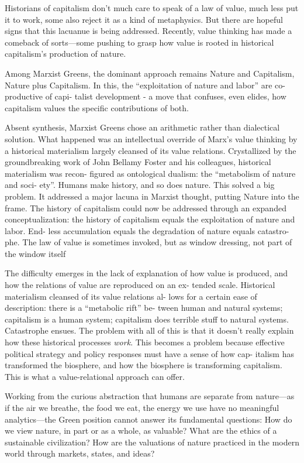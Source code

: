 \documentclass[
]{book}
\begin{document}
Historians of
capitalism don't much care to speak of a law of value, much less put
it to work, some also reject it as
a kind of metaphysics. But there are hopeful signs that
this lacuanue is being addressed. Recently, value thinking has made a
comeback of sorts---some pushing to grasp how value is rooted in
historical capitalism's production of nature.

Among Marxist Greens, the dominant
approach remains Nature and Capitalism, Nature plus Capitalism. In
this, the ``exploitation of nature and labor'' are co-productive of capi-
talist development - a move that confuses, even elides,
how capitalism values the specific contributions of both.

Absent synthesis, Marxist Greens chose an arithmetic rather than
dialectical solution. What happened was an intellectual override of
Marx's value thinking by a historical materialism largely cleansed of
its value relations. Crystallized by the groundbreaking work of John
Bellamy Foster and his colleagues, historical materialism was recon-
figured as ontological dualism: the ``metabolism of nature and soci-
ety''. Humans make history, and so does nature.
This solved a big problem. It addressed a major lacuna in Marxist
thought, putting Nature into the frame. The history of capitalism
could now be addressed through an expanded conceptualization: the
history of capitalism equals the exploitation of nature and labor. End-
less accumulation equals the degradation of nature equals catastro-
phe. The law of value is sometimes invoked, but as window dressing,
not part of the window itself

The difficulty emerges in the lack of explanation of how value is
produced, and how the relations of value are reproduced on an ex-
tended scale. Historical materialism cleansed of its value relations al-
lows for a certain ease of description: there is a ``metabolic rift'' be-
tween human and natural systems; capitalism is a human system;
capitalism does terrible stuff to natural systems. Catastrophe ensues.
The problem with all of this is that it doesn't really explain how these
historical processes \emph{work}. This becomes a problem because effective
political strategy and policy responses must have a sense of how cap-
italism has transformed the biosphere, and how the biosphere is
transforming capitalism. This is what a value-relational approach can
offer.

Working from the curious abstraction that humans are separate
from nature---as if the air we breathe, the food we eat, the energy we
use have no meaningful analytics---the Green position cannot answer
its fundamental questions: How do we view nature, in part or as a
whole, as valuable? What are the ethics of a sustainable civilization?
How are the valuations of nature practiced in the modern world
through markets, states, and ideas?
\end{document}
